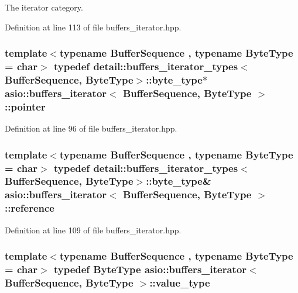 The iterator category. 



Definition at line 113 of file buffers\+\_\+iterator.\+hpp.

\hypertarget{classasio_1_1buffers__iterator_a15f732e586b13d7b0d23b5b2ea3b3cb9}{}
\subsubsection[{pointer}]{\setlength{\rightskip}{0pt plus 5cm}template$<$typename Buffer\+Sequence , typename Byte\+Type  = char$>$ typedef {\bf detail\+::buffers\+\_\+iterator\+\_\+types}$<$ Buffer\+Sequence, Byte\+Type$>$\+::byte\+\_\+type$\ast$ {\bf asio\+::buffers\+\_\+iterator}$<$ Buffer\+Sequence, Byte\+Type $>$\+::{\bf pointer}}\label{classasio_1_1buffers__iterator_a15f732e586b13d7b0d23b5b2ea3b3cb9}


Definition at line 96 of file buffers\+\_\+iterator.\+hpp.

\hypertarget{classasio_1_1buffers__iterator_aa57e1b880d781aa295f143cb4f5db61d}{}
\subsubsection[{reference}]{\setlength{\rightskip}{0pt plus 5cm}template$<$typename Buffer\+Sequence , typename Byte\+Type  = char$>$ typedef {\bf detail\+::buffers\+\_\+iterator\+\_\+types}$<$ Buffer\+Sequence, Byte\+Type$>$\+::byte\+\_\+type\& {\bf asio\+::buffers\+\_\+iterator}$<$ Buffer\+Sequence, Byte\+Type $>$\+::{\bf reference}}\label{classasio_1_1buffers__iterator_aa57e1b880d781aa295f143cb4f5db61d}


Definition at line 109 of file buffers\+\_\+iterator.\+hpp.

\hypertarget{classasio_1_1buffers__iterator_aa350a7aa5afa6fbf17ecd4f8cc349821}{}
\subsubsection[{value\+\_\+type}]{\setlength{\rightskip}{0pt plus 5cm}template$<$typename Buffer\+Sequence , typename Byte\+Type  = char$>$ typedef Byte\+Type {\bf asio\+::buffers\+\_\+iterator}$<$ Buffer\+Sequence, Byte\+Type $>$\+::{\bf value\+\_\+type}}\label{classasio_1_1buffers__iterator_aa350a7aa5afa6fbf17ecd4f8cc349821}


